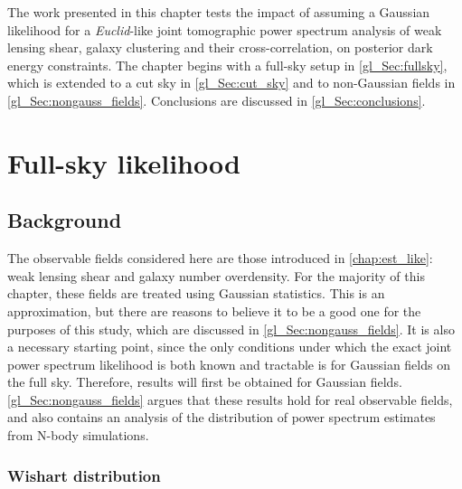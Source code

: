 The work presented in this chapter tests the impact of assuming a Gaussian likelihood for a \textit{Euclid}-like joint tomographic \ttp{} power spectrum analysis of weak lensing shear, galaxy clustering and their cross-correlation, on posterior dark energy constraints. The chapter begins with a full-sky setup in \autoref{gl_Sec:fullsky}, which is extended to a cut sky in \autoref{gl_Sec:cut_sky} and to non-Gaussian fields in \autoref{gl_Sec:nongauss_fields}. Conclusions are discussed in \autoref{gl_Sec:conclusions}.

\section{Full-sky likelihood}
\label{gl_Sec:fullsky}

\subsection{Background}

The observable fields considered here are those introduced in \autoref{chap:est_like}: weak lensing shear and galaxy number overdensity. For the majority of this chapter, these fields are treated using Gaussian statistics.
This is an approximation, but there are reasons to believe it to be a good one for the purposes of this study, which are discussed in \autoref{gl_Sec:nongauss_fields}. It is also a necessary starting point, since the only conditions under which the exact joint power spectrum likelihood is both known and tractable is for Gaussian fields on the full sky. Therefore, results will first be obtained for Gaussian fields. \autoref{gl_Sec:nongauss_fields} argues that these results hold for real observable fields, and also contains an analysis of the distribution of power spectrum estimates from N-body simulations.

\subsubsection{Wishart distribution}

